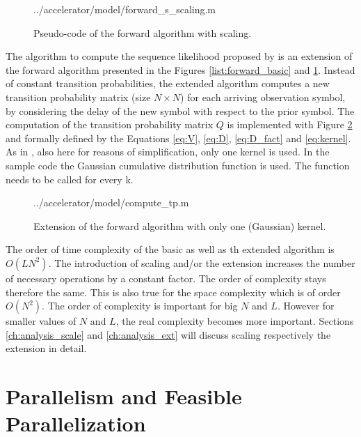 \documentclass[mscthesis]{usiinfthesis}
\begin{document}
\begin{figure}
    \centering
    
        {../accelerator/model/forward_s_scaling.m}
    \caption{Pseudo-code of the forward algorithm with scaling.}
    \label{list:forward_scaling}
\end{figure}

The algorithm to compute the sequence likelihood proposed by \cite{salfner08}
is an extension of the forward algorithm presented in the Figures
\ref{list:forward_basic} and \ref{list:forward_scaling}. Instead of constant
transition probabilities, the extended algorithm computes a new transition
probability matrix (size $ N \times N$) for each arriving observation symbol,
by considering the delay of the new symbol with respect to the prior symbol.
The computation of the transition probability matrix $ Q $ is implemented with
Figure \ref{list:ext} and formally defined by the Equations \ref{eq:V},
\ref{eq:D}, \ref{eq:D_fact} and \ref{eq:kernel}. As in \cite{salfner08}, also
here for reasons of simplification, only one kernel is used. In the sample code
the Gaussian cumulative distribution function is used. The function needs to be
called for every k.

\begin{figure}
    \centering
    
        {../accelerator/model/compute_tp.m}
        \caption{Extension of the forward algorithm with only one (Gaussian)
            kernel.}
    \label{list:ext}
\end{figure}

The order of time complexity of the basic as well as th extended algorithm is
$O(LN^2)$. The introduction of scaling and/or the extension increases the
number of necessary operations by a constant factor. The order of complexity
stays therefore the same. This is also true for the space complexity which is of
order $O(N^2)$. The order of complexity is important for big $N$ and $L$.
However for smaller values of $N$ and $L$, the real complexity becomes more
important. Sections \ref{ch:analysis_scale} and \ref{ch:analysis_ext} will
discuss scaling respectively the extension in detail.

\section{Parallelism and Feasible Parallelization}
\label{ch:analysis_parallel}
\end{document}
